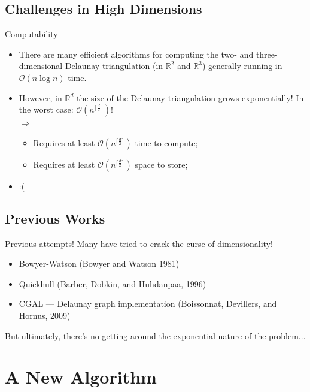 \documentclass[xcolor=dvipsnames]{beamer}
\begin{document}
\subsection{Challenges in High Dimensions}
\begin{frame}{Computability}
\begin{itemize}
\item There are many efficient algorithms for computing the two- and 
three-dimensional Delaunay triangulation (in $\mathbb{R}^2$ and $\mathbb{R}^3$)
generally running in $\mathcal{O}(n\log n)$ time.
\item However, in $\mathbb{R}^d$ the size of the Delaunay triangulation grows
exponentially! In the worst case: $\mathcal{O}(n^{\lceil\frac{d}{2}\rceil})$!\\
$\Rightarrow$
\begin{itemize}
\item Requires at least $\mathcal{O}(n^{\lceil\frac{d}{2}\rceil})$ time
to compute;
\item Requires at least $\mathcal{O}(n^{\lceil\frac{d}{2}\rceil})$ space
to store;
\end{itemize}
\end{itemize}
\pause
\begin{itemize}
\item :(
\end{itemize}
\end{frame}
\subsection{Previous Works}
\begin{frame}{Previous attempts!}
Many have tried to crack the curse of dimensionality!
\begin{itemize}
\item Bowyer-Watson (Bowyer and Watson 1981)
\item Quickhull (Barber, Dobkin, and Huhdanpaa, 1996)
\item CGAL --- Delaunay graph implementation
(Boissonnat, Devillers, and Hornus, 2009)
\end{itemize}
But ultimately, there's no getting around the exponential nature of the 
problem...
\end{frame}

\section{A New Algorithm}
\end{document}

